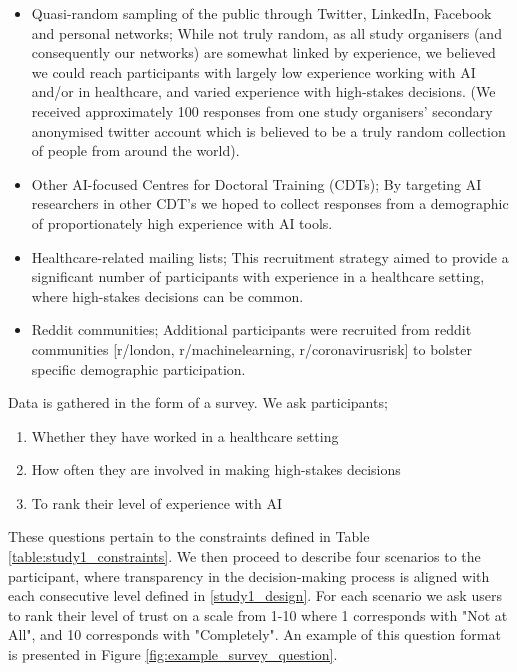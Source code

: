 \documentclass[manuscript,screen,review]{acmart}
\begin{document}
\begin{itemize}
    \item Quasi-random sampling of the public through Twitter, LinkedIn, Facebook and personal networks; While not truly random, as all study organisers (and consequently our networks) are somewhat linked by experience, we believed we could reach participants with largely low experience working with AI and/or in healthcare, and varied experience with high-stakes decisions. (We received approximately 100 responses from one study organisers' secondary anonymised twitter account which is believed to be a truly random collection of people from around the world).
    \item Other AI-focused Centres for Doctoral Training (CDTs); By targeting AI researchers in other CDT's we hoped to collect responses from a demographic of proportionately high experience with AI tools.
    \item Healthcare-related mailing lists; This recruitment strategy aimed to provide a significant number of participants with experience in a healthcare setting, where high-stakes decisions can be common.
    \item Reddit communities; Additional participants were recruited from reddit communities [r/london, r/machinelearning, r/coronavirusrisk] to bolster specific demographic participation.
\end{itemize}

Data is gathered in the form of a survey. We ask participants;

\begin{enumerate}
    \item Whether they have worked in a healthcare setting
    \item How often they are involved in making high-stakes decisions
    \item To rank their level of experience with AI
\end{enumerate}

These questions pertain to the constraints defined in Table \ref{table:study1_constraints}. We then proceed to describe four scenarios to the participant, where transparency in the decision-making process is aligned with each consecutive level defined in \ref{study1_design}. For each scenario we ask users to rank their level of trust on a scale from 1-10 where 1 corresponds with "Not at All", and 10 corresponds with "Completely". An example of this question format is presented in Figure \ref{fig:example_survey_question}.
\end{document}
